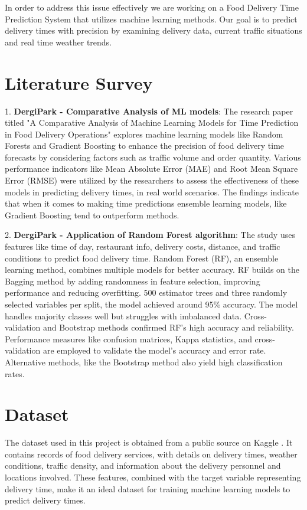 \documentclass[10pt,twocolumn,letterpaper]{article}
\begin{document}
In order to address this issue effectively we are working on a Food Delivery Time Prediction System that utilizes machine learning methods. Our goal is to predict delivery times with precision by examining delivery data, current traffic situations and real time weather trends.

\section{Literature Survey}
1. \textbf{DergiPark - Comparative Analysis of ML models}: The research paper titled "A Comparative Analysis of Machine Learning Models for Time Prediction in Food Delivery Operations" explores machine learning models like Random Forests and Gradient Boosting to enhance the precision of food delivery time forecasts by considering factors such as traffic volume and order quantity. Various performance indicators like Mean Absolute Error (MAE) and Root Mean Square Error (RMSE) were utilized by the researchers to assess the effectiveness of these models in predicting delivery times, in real world scenarios. The findings indicate that when it comes to making time predictions ensemble learning models, like Gradient Boosting tend to outperform methods. \cite{dergipark1}

2. \textbf{DergiPark - Application of Random Forest algorithm}: The study uses features like time of day, restaurant info, delivery costs, distance, and traffic conditions to predict food delivery time. Random Forest (RF), an ensemble learning method, combines multiple models for better accuracy. RF builds on the Bagging method by adding randomness in feature selection, improving performance and reducing overfitting. 500 estimator trees and three randomly selected variables per split, the model achieved around 95\% accuracy. The model handles majority classes well but struggles with imbalanced data. Cross-validation and Bootstrap methods confirmed RF's high accuracy and reliability. Performance measures like confusion matrices, Kappa statistics, and cross-validation are employed to validate the model’s accuracy and error rate. Alternative methods, like the Bootstrap method also yield high classification rates. \cite{dergipark2}

\section{Dataset}
    The dataset used in this project is obtained from a public source on Kaggle \cite{kaggle}. It contains records of food delivery services, with details on delivery times, weather conditions, traffic density, and information about the delivery personnel and locations involved. These features, combined with the target variable representing delivery time, make it an ideal dataset for training machine learning models to predict delivery times.
\end{document}
